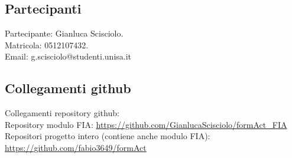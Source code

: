 \documentclass[10pt,a4paper]{article}
\begin{document}
   \subsection{Partecipanti}
   Partecipante: Gianluca Scisciolo.\\
   Matricola: 0512107432.\\
   Email: g.scisciolo@studenti.unisa.it
   \subsection{Collegamenti github}
   Collegamenti repository github:\\
   Repository modulo FIA: \url{https://github.com/GianlucaScisciolo/formAct_FIA}\\
   Repositori progetto intero (contiene anche modulo FIA): \url{https://github.com/fabio3649/formAct}\\
   
     
\end{document}
